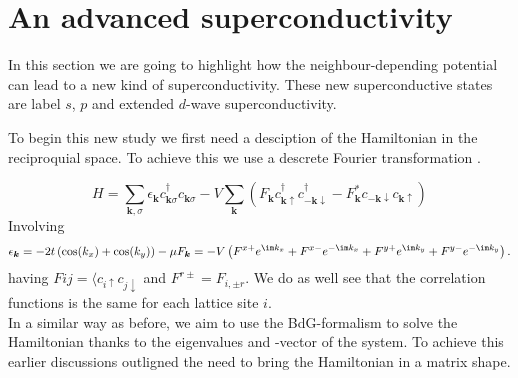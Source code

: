 \documentclass[../main.tex]{subfile}
\begin{document}
\section{An advanced superconductivity}
In this section we are going to highlight how the neighbour-depending potential can lead to a new kind of superconductivity.
These new superconductive states are label $s$, $p$ and extended $d$-wave superconductivity.

To begin this new study we first need a desciption of the Hamiltonian in the reciproquial space. 
To achieve this we use a descrete Fourier transformation .

\begin{equation*}
    H = \sum_{\bm{k},\sigma} \epsilon_{\bm{k}} c_{\bm{k}\sigma}^{\dagger} c_{\bm{k}\sigma} 
    - V \sum_{\bm{k}} \left( F_{\bm{k}} c^{\dagger}_{\bm{k}\uparrow} c^{\dagger}_{-\bm{k}\downarrow}
    - F_{\bm{k}}^{\ast} c_{-\bm{k}\downarrow} c_{\bm{k}\uparrow} \right)
\end{equation*}
Involving 
\begin{equation*}
    \epsilon_{\bm{k}} = -2t \left( \cos(k_x) + \cos(k_y) \right) - \mu
    F_{\bm{k}} = - V \left(F^{x+} e^{\im k_x} + F^{x-}e^{-\im k_x} + F^{y+} e^{\im k_y} + F^{y-}e^{-\im k_y} \right). 
\end{equation*}
having $F{ij} = \langle c_{i\uparrow} c_{j\downarrow}$ and $F^{r\pm} = F_{i, \pm r}$. We do as well see that the correlation functions is the same
for each lattice site $i$.\\

In a similar way as before, we aim to use the BdG-formalism to solve the Hamiltonian thanks to the eigenvalues and -vector of the system.
To achieve this earlier discussions outligned the need to bring the Hamiltonian in a matrix shape.
\end{document}
